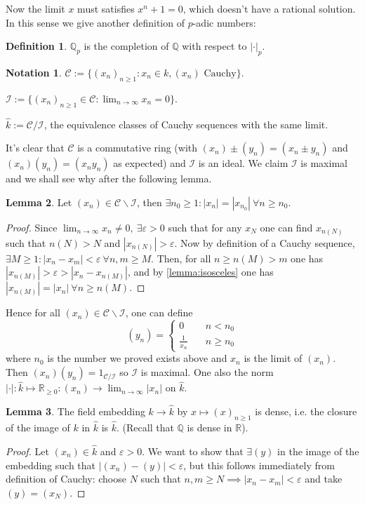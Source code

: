 \documentclass{article}
\newcommand{\Q}{\mathbb{Q}}
\newcommand{\R}{\mathbb{R}}
\theoremstyle{definition}
\newtheorem{defn}{Definition}[subsection]
\newtheorem{lemma}[defn]{Lemma}
\newtheorem*{notation}{Notation}
\begin{document}
Now the limit $x$ must satisfies $x^n+1=0$, which doesn't have a rational solution. In this sense we give another definition of $p$-adic numbers:
\begin{defn}
$\Q_p$ is the completion of $\Q$ with respect to $|\cdot|_p$.
\end{defn}

\begin{notation}
$\mathcal C:=\{(x_n)_{n\geq 1}:x_n\in k,(x_n)\text{ Cauchy}\}$.

$\mathcal I:=\{(x_n)_{n\geq 1}\in\mathcal C:\lim_{n\rightarrow\infty} x_n=0\}$.

$\widehat k:=\mathcal C/\mathcal I$, the equivalence classes of Cauchy sequences with the same limit.

It's clear that $\mathcal C$ is a commutative ring (with $(x_n)\pm (y_n)=(x_n\pm y_n)$ and $(x_n)(y_n)=(x_ny_n)$ as expected) and $\mathcal I$ is an ideal. We claim $\mathcal I$ is maximal and we shall see why after the following lemma.
\end{notation}

\begin{lemma}
Let $(x_n)\in \mathcal C\backslash \mathcal I$, then $\exists n_0\geq 1: |x_n|=|x_{n_0}| \ \forall n\geq n_0$.
\end{lemma}

\begin{proof}
Since $\lim_{n\rightarrow\infty} x_n\neq 0,\ \exists \varepsilon>0$ such that for any $x_N$ one can find $x_{n(N)}$ such that $n(N)>N$ and $|x_{n(N)}|>\varepsilon$. Now by definition of a Cauchy sequence, $\exists M\geq 1:|x_n-x_m|<\varepsilon \ \forall n,m\geq M$. Then, for all $n\geq n(M)>m$ one has $|x_{n(M)}|>\varepsilon>|x_n-x_{n(M)}|$, and by \ref{lemma:isosceles} one has $|x_{n(M)}|=|x_n| \ \forall n\geq n(M)$.
\end{proof}

Hence for all $(x_n)\in\mathcal C\backslash\mathcal I$, one can define
\[
(y_n)=\left\{\begin{aligned}
0 &\quad n<n_0 \\
\frac{1}{x_n}&\quad n\geq n_0
\end{aligned} \right.
\]
where $n_0$ is the number we proved exists above and $x_n$ is the limit of $(x_n)$. Then $(x_n)(y_n)=1_{\mathcal C/\mathcal I}$ so $\mathcal I$ is maximal. One also the norm $|\cdot|:\widehat k\mapsto\R_{\geq 0}:(x_n)\rightarrow\lim_{n\rightarrow\infty}|x_n|$ on $\widehat k$.

\begin{lemma}
The field embedding $k\rightarrow\widehat k$ by $x\mapsto (x)_{n\geq 1}$ is dense, i.e. the closure of the image of $k$ in $\widehat k$ is $\widehat k$. (Recall that $\Q$ is dense in $\R$).
\end{lemma}
\begin{proof}
Let $(x_n)\in\widehat k$ and $\varepsilon>0$. We want to show that $\exists (y)$ in the image of the embedding such that $|(x_n)-(y)|<\varepsilon$, but this follows immediately from definition of Cauchy: choose $N$ such that $n,m\geq N\implies|x_n-x_m|<\varepsilon$ and take $(y)=(x_N)$.
\end{proof}
\end{document}
